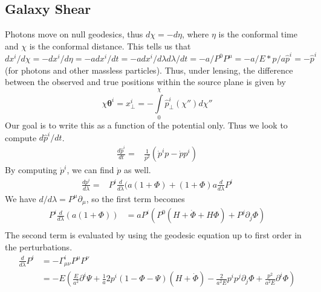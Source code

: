 \subsection{Galaxy Shear}
Photons move on null geodesics, thus $d\chi = -d\eta$, where $\eta$ is the conformal time and $\chi$ is the conformal distance. This tells us that $dx^i/d\chi = -dx^i/d\eta = -a dx^i/dt = -a dx^i/d\lambda d\lambda/dt = -a/P^0 P^\mu = -a / E * p/a \hat{p}^i = -\hat{p}^i$ (for photons and other massless particles).
Thus, under lensing, the difference between the observed and true positions within the source plane is given by
\begin{equation}
	\chi\mathbf{\theta}^i = x_\perp^i = -\int\limits_0^\chi \hat{p}^i_\perp(\chi'') d\chi''
\end{equation}
Our goal is to write this as a function of the potential only. Thus we look to compute $d\hat{p}^i/dt$.
\begin{equation}
	\begin{split}
		\frac{d\hat{p}^i}{dt} %
		=& \frac{1}{p^2}(\dot{p}^i p - \dot{p}p^i)
	\end{split}
\end{equation}
By computing $\dot p^i$, we can find $\dot p$ as well.
\begin{equation}
	\begin{split}
		\frac{dp^i}{d\lambda} %
		=& P^i\frac{d}{d\lambda}(a(1+\Phi)+(1+\Phi)a\frac{d}{d\lambda}P^i
	\end{split}
\end{equation}
We have $d/d\lambda = P^\mu \partial_\mu$, so the first term becomes
\begin{equation}
	\begin{split}
		P^i\frac{d}{d\lambda}(a(1+\Phi)) %
		&= a P^i (P^0(H+\dot\Phi +H\Phi) + P^j\partial_j\Phi) \\
	\end{split}
\end{equation}
The second term is evaluated by using the geodesic equation up to first order in the perturbations.
\begin{equation}
	\begin{split}
		\frac{d}{d\lambda}P^i &= -\Gamma^i_{\mu\nu}P^\mu P^\nu \\
		&= -E\left( \frac{E}{a^2} \partial^i\Psi + \frac{1}{a}2p^i(1-\Phi-\Psi)(H+\dot\Phi) - \frac{2}{a^2E}p^ip^j\partial_j\Phi + \frac{p^2}{a^2E} \partial^i\Phi \right)
	\end{split}
\end{equation}

